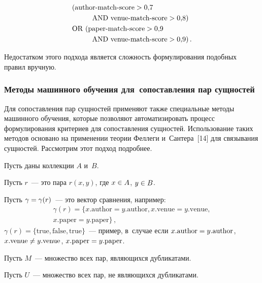 \begin{multicols}{2}
  \vspace*{-4pt}

  \noindent
  \begin{align*}
&(\mathrm{author\mbox{-}match\mbox{-}score > 0{,}7}\\
&\hspace*{10mm}\mathrm{AND\ venue\mbox{-}match\mbox{-}score >0{,}8)}\\
  &\mathrm{OR\ (paper\mbox{-}match\mbox{-}score > 0{,}9}\\
&\hspace*{10mm}\mathrm{AND\
  venue\mbox{-}match\mbox{-}score>0{,}9)}\,.
  \end{align*}

  \vspace*{-4pt}

  Недостатком этого подхода является сложность формулирования подобных правил
вручную.



  \subsubsection{Методы машинного обучения для~сопоставления пар
сущностей}

  Для сопоставления пар сущностей применяют также специальные методы машинного
обучения, которые позволяют автоматизировать процесс формулирования критериев для
сопоставления сущностей. Использование таких методов основано на применении теории
Фел\-ле\-ги и~Сантера~[14] для связывания сущностей. Рассмотрим этот подход подробнее.

  Пусть даны коллекции $A$ и~$B$.

  Пусть $r$~--- это пара $r(x,y)$, где $x\hm\in {A}$, $y\hm\in {B}$.

  Пусть $\gamma \hm=\gamma(r)$~--- это вектор сравнения, например:
    \begin{multline*}
  \gamma(r) = \{x.\mathrm{author} = y.\mathrm{author},x.\mathrm{venue}=y.\mathrm{venue},\\
  x.\mathrm{paper}=y.\mathrm{paper}\}\,,
\end{multline*}
  $\gamma(r) = \{\mathrm{true}, \mathrm{false}, \mathrm{true}\}$~--- пример, в~случае если
  $x.\mathrm{author}\hm=y.\mathrm{author}$, $x.\mathrm{venue}\hm\not= y.\mathrm{venue}$,
  $x.\mathrm{paper}\hm=y.\mathrm{paper}$.

  Пусть $M$~--- множество всех пар, являющихся дубликатами.

  Пусть $U$~--- множество всех пар, не являющихся дубликатами.


\end{multicols}
